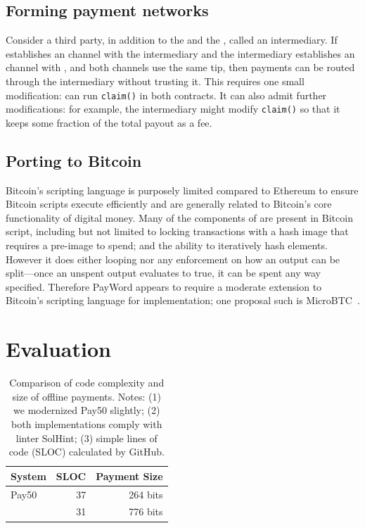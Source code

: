 \subsection{Forming payment networks} 

Consider a third party, in addition to the \make and the \take, called an intermediary. If \make establishes an \ew channel with the intermediary and the intermediary establishes an \ew channel with \take, and both channels use the same tip, then payments can be routed through the intermediary without trusting it. This requires one small modification: \take can run \texttt{claim()} in both contracts. It can also admit further modifications: for example, the intermediary might modify \texttt{claim()} so that it keeps some fraction of the total payout as a fee.

\subsection{Porting to Bitcoin}

Bitcoin's scripting language is purposely limited compared to Ethereum to ensure Bitcoin scripts execute efficiently and are generally related to Bitcoin's core functionality of digital money. Many of the components of \pw are present in Bitcoin script, including but not limited to locking transactions with a hash image that requires a pre-image to spend; and the ability to iteratively hash elements. However it does either looping nor any enforcement on how an output can be split---\ie once an unspent output evaluates to true, it can be spent any way specified. Therefore PayWord appears to require a moderate extension to Bitcoin's scripting language for implementation; one proposal such is MicroBTC~\cite{Wan18}.


\section{Evaluation}

\begin{table}[t]          
\centering
\begin{tabular}{ l | r | r }
System 		& SLOC 	& Payment Size 	  \\ \hline
\textsf{Pay50} 	& 37  	& 264 bits  		  \\
\eww 		& 31		& 776 bits  		  \\ 
\end{tabular}
\caption{Comparison of code complexity and size of offline payments. Notes: (1) we modernized \textsf{Pay50} slightly; (2) both implementations comply with linter SolHint; (3) simple lines of code (SLOC) calculated by GitHub.\label{table:loc}}
\end{table}

